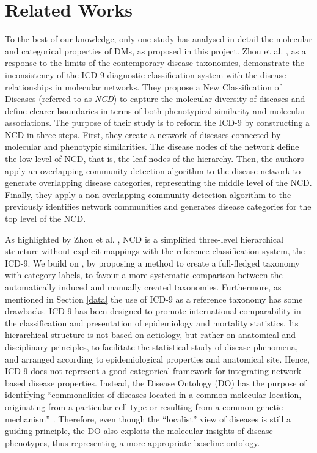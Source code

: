 \documentclass[journal,twoside,web]{ieeecolor}
\begin{document}
\section{Related Works}
\label{related works}
To the best of our knowledge, only one study has analysed in detail the molecular and categorical properties of DMs, as proposed in this project. 
Zhou et al. \cite{zhou2018systems}, as a response to the limits of the contemporary disease taxonomies, demonstrate the inconsistency of the ICD-9 diagnostic classification system with the disease relationships in molecular networks. They propose a New Classification of Diseases (referred to as \textit{NCD}) to capture the molecular diversity of diseases and define clearer boundaries in terms of both phenotypical similarity and molecular associations. 
The purpose of their study is to reform the ICD-9 by constructing a NCD in three steps. First, they create a network of diseases connected by molecular and phenotypic similarities. The disease nodes of the network define the low level of NCD, that is, the leaf nodes of the hierarchy. Then, the authors apply an overlapping community detection algorithm to the disease network to generate overlapping disease categories, representing the middle level of the NCD. Finally, they apply a non-overlapping community detection algorithm to the previously identifies network communities and generates disease categories for the top level of the NCD. 

As highlighted by Zhou et al. \cite{zhou2018systems}, NCD is a simplified three-level hierarchical structure without explicit mappings with the reference classification system, the ICD-9. We build on \cite{zhou2018systems}, by proposing  a method to create a full-fledged taxonomy with category labels, to favour a more systematic comparison between the automatically induced and manually created taxonomies.
Furthermore, as mentioned in Section \ref{data} the use of ICD-9 as a reference taxonomy has some drawbacks.
ICD-9  has been designed to promote international comparability in the classification and presentation of epidemiology and mortality statistics. Its hierarchical structure is not based on aetiology, but rather on anatomical and disciplinary principles,
to facilitate the statistical study of disease phenomena, and arranged according to epidemiological properties and anatomical site. 
Hence, ICD-9 does not represent a good categorical framework for integrating network-based disease properties. Instead, the Disease Ontology (DO) has the purpose of identifying “commonalities of diseases located in a common molecular location, originating from a particular cell type or resulting from a common genetic mechanism” \cite{schriml2012disease}. Therefore, even though the “localist” view of diseases is still a guiding principle, the DO also exploits the molecular insights of disease phenotypes, thus representing a more appropriate baseline ontology. \\
\vspace{-15pt}
\end{document}
